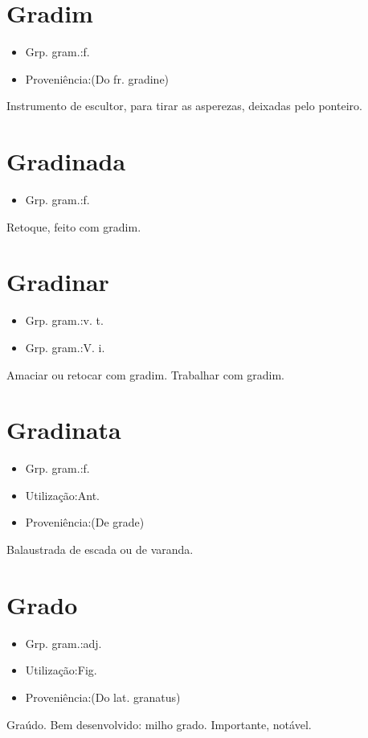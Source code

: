 \section{Gradim}
\begin{itemize}
\item {Grp. gram.:f.}
\end{itemize}
\begin{itemize}
\item {Proveniência:(Do fr. \textunderscore gradine\textunderscore )}
\end{itemize}
Instrumento de escultor, para tirar as asperezas, deixadas pelo ponteiro.
\section{Gradinada}
\begin{itemize}
\item {Grp. gram.:f.}
\end{itemize}
Retoque, feito com gradim.
\section{Gradinar}
\begin{itemize}
\item {Grp. gram.:v. t.}
\end{itemize}
\begin{itemize}
\item {Grp. gram.:V. i.}
\end{itemize}
Amaciar ou retocar com gradim.
Trabalhar com gradim.
\section{Gradinata}
\begin{itemize}
\item {Grp. gram.:f.}
\end{itemize}
\begin{itemize}
\item {Utilização:Ant.}
\end{itemize}
\begin{itemize}
\item {Proveniência:(De \textunderscore grade\textunderscore )}
\end{itemize}
Balaustrada de escada ou de varanda.
\section{Grado}
\begin{itemize}
\item {Grp. gram.:adj.}
\end{itemize}
\begin{itemize}
\item {Utilização:Fig.}
\end{itemize}
\begin{itemize}
\item {Proveniência:(Do lat. \textunderscore granatus\textunderscore )}
\end{itemize}
Graúdo.
Bem desenvolvido: \textunderscore milho grado\textunderscore .
Importante, notável.
